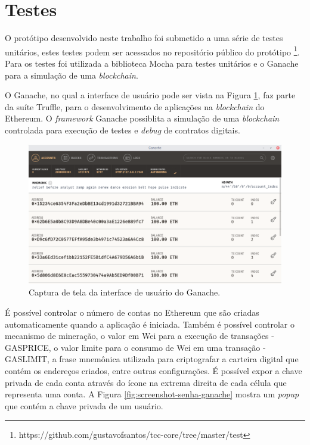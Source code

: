 \documentclass[tcc,capa]{texufpel}
\begin{document}
    \section{Testes}
    
    O protótipo desenvolvido neste trabalho foi submetido a uma série de testes unitários, estes testes podem ser acessados no repositório público do protótipo \footnote{https://github.com/gustavofsantos/tcc-core/tree/master/test}. Para os testes foi utilizada a biblioteca Mocha para testes unitários e o Ganache para a simulação de uma \textit{blockchain}.
    
    O Ganache, no qual a interface de usuário pode ser vista na Figura \ref{fig:screenshot-ganache}, faz parte da suíte Truffle, para o desenvolvimento de aplicações na \textit{blockchain} do Ethereum. O \textit{framework} Ganache possiblita a simulação de uma \textit{blockchain} controlada para execução de testes e \textit{debug} de contratos digitais.
    
    \begin{figure}[h!]
        \centering
        \includegraphics[width=15cm]{imagens/ganache.png}
        \caption{Captura de tela da interface de usuário do Ganache.}
        \label{fig:screenshot-ganache}
    \end{figure}
    
    É possível controlar o número de contas no Ethereum que são criadas automaticamente quando a aplicação é iniciada. Também é possível controlar o mecanismo de mineração, o valor em Wei para a execução de transações - GASPRICE, o valor limite para o consumo de Wei em uma transação - GASLIMIT, a frase mnemônica utilizada para criptografar a carteira digital que contém os endereços criados, entre outras configurações. É possível expor a chave privada de cada conta através do ícone na extrema direita de cada célula que representa uma conta. A Figura \ref{fig:screenshot-senha-ganache} mostra um \textit{popup} que contém a chave privada de um usuário.
    
\end{document}
